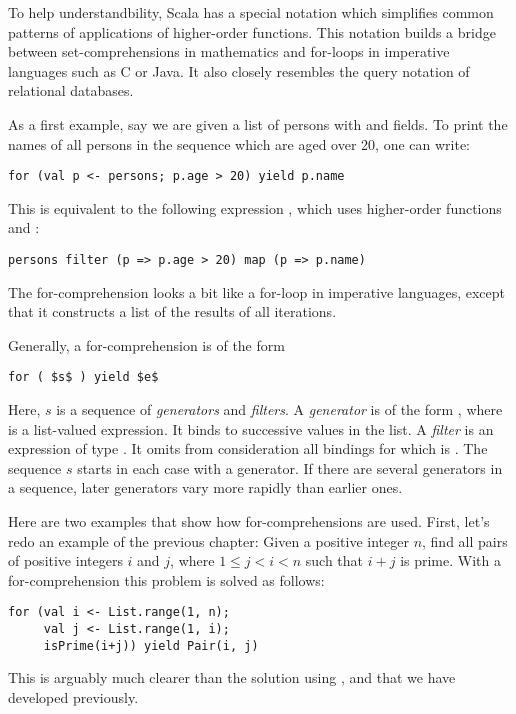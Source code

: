 \documentclass[a4paper,12pt,twoside,titlepage]{book}
\begin{document}
To help understandbility, Scala has a special notation which
simplifies common patterns of applications of higher-order functions.
This notation builds a bridge between set-comprehensions in
mathematics and for-loops in imperative languages such as C or
Java. It also closely resembles the query notation of relational
databases.

As a first example, say we are given a list  of persons
with  and  fields.  To print the names of all
persons in the sequence which are aged over 20, one can write:
\begin{lstlisting}
for (val p <- persons; p.age > 20) yield p.name
\end{lstlisting}
This is equivalent to the following expression , which uses
higher-order functions  and :
\begin{lstlisting}
persons filter (p => p.age > 20) map (p => p.name)
\end{lstlisting}
The for-comprehension looks a bit like a for-loop in imperative languages,
except that it constructs a list of the results of all iterations.

Generally, a for-comprehension is of the form
\begin{lstlisting}
for ( $s$ ) yield $e$
\end{lstlisting}
Here, $s$ is a sequence of {\em generators} and {\em filters}.  A {\em
generator} is of the form , where  is a
list-valued expression. It binds  to successive values in the
list.  A {\em filter} is an expression  of type
.  It omits from consideration all bindings for which
 is .  The sequence $s$ starts in each case with a
generator.  If there are several generators in a sequence, later
generators vary more rapidly than earlier ones.

Here are two examples that show how for-comprehensions are used.
First, let's redo an example of the previous chapter: Given a positive
integer $n$, find all pairs of positive integers $i$ and $j$, where $1
\leq j < i < n$ such that $i + j$ is prime. With a for-comprehension
this problem is solved as follows:
\begin{lstlisting}
for (val i <- List.range(1, n);
     val j <- List.range(1, i);
     isPrime(i+j)) yield Pair(i, j)
\end{lstlisting}
This is arguably much clearer than the solution using ,
 and  that we have developed previously.
\end{document}
